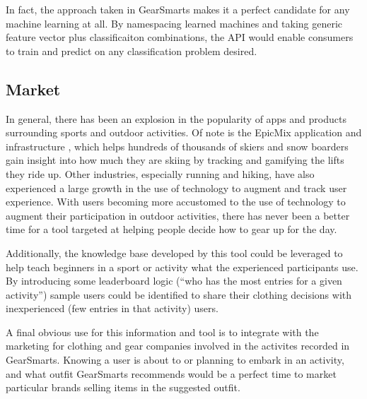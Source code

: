 In fact, the approach taken in GearSmarts makes it a perfect candidate for any machine learning at all. By namespacing
learned machines and taking generic feature vector plus classificaiton combinations, the API would enable consumers to
train and predict on any classification problem desired.

\subsection{Market}
In general, there has been an explosion in the popularity of apps and products surrounding sports and outdoor activities.
Of note is the EpicMix application and infrastructure \cite{EpicMix:Site}, which helps hundreds of thousands of skiers and snow
boarders \cite{EpicMix:PlayStore} gain insight into how much they are skiing by tracking and gamifying the lifts they ride up.
Other industries, especially running and hiking, have also experienced a large growth in the use of technology to augment and
track user experience. With users becoming more accustomed to the use of technology to augment their participation in outdoor
activities, there has never been a better time for a tool targeted at helping people decide how to gear up for the day.

Additionally, the knowledge base developed by this tool could be leveraged to help teach beginners in a sport or activity
what the experienced participants use. By introducing some leaderboard logic (``who has the most entries for a given activity'')
sample users could be identified to share their clothing decisions with inexperienced (few entries in that activity) users.

A final obvious use for this information and tool is to integrate with the marketing for clothing and gear companies
involved in the activites recorded in GearSmarts. Knowing a user is about to or planning to embark in an activity, and
what outfit GearSmarts recommends would be a perfect time to market particular brands selling items in the suggested outfit.